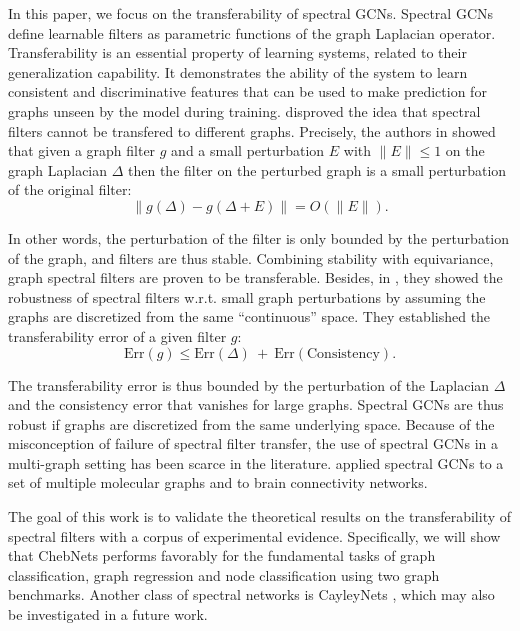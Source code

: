 \documentclass[letterpaper]{article} \usepackage{aaai21}  \usepackage{times}  \usepackage{helvet} \usepackage{courier}  \usepackage[hyphens]{url}  \usepackage{graphicx} \usepackage{natbib}  \usepackage{caption} \frenchspacing  \setlength{\pdfpagewidth}{8.5in}  \setlength{\pdfpageheight}{11in}
\begin{document}
In this paper, we focus on the transferability of spectral GCNs. Spectral GCNs define learnable filters as parametric functions of the graph Laplacian operator.
Transferability is an essential property of learning systems, related to their generalization capability. It demonstrates the ability of the system to learn consistent and discriminative features that can be used to make prediction for graphs unseen by the model during training.
\cite{levie_transferability_2019,levie_transferability_2019-1} disproved the idea that spectral filters cannot be transfered to different graphs. Precisely, the authors in \cite{levie_transferability_2019} showed that given a graph filter $g$ and a small perturbation $E$ with $\|E \|\leq 1$ on the graph Laplacian $\Delta$ then the filter on the perturbed graph is a small perturbation of the original filter:
$$
\| g(\Delta) - g(\Delta+E) \| = O(\|E \|).
$$

In other words, the perturbation of the filter is only bounded by the perturbation of the graph, and filters are thus stable. Combining stability with equivariance, graph spectral filters are proven to be transferable.
Besides, in \cite{levie_transferability_2019-1}, they showed the robustness of spectral filters w.r.t. small graph perturbations by assuming the graphs are discretized from the same “continuous” space. They established the transferability error of a given filter $g$:
$$
\textrm{Err}(g) \leq \textrm{Err}(\Delta) \ + \ \textrm{Err}(\textrm{Consistency}).
$$

The transferability error is thus bounded by the perturbation of the Laplacian $\Delta$ and the consistency error that vanishes for large graphs. Spectral GCNs are thus robust if graphs are discretized from the same underlying space.
Because of the misconception of failure of spectral filter transfer, the use of spectral GCNs in a multi-graph setting has been scarce in the literature. \cite{knyazev_spectral_2018} applied spectral GCNs to a set of multiple molecular graphs and \cite{ktena2018metric} to brain connectivity networks.

The goal of this work is to validate the theoretical results on the transferability of spectral filters with a corpus of experimental evidence. Specifically, we will show that ChebNets \cite{defferrard_convolutional_nodate} performs favorably for the fundamental tasks of graph classification, graph regression and node classification using two graph benchmarks. Another  class of spectral networks is CayleyNets \cite{levie2018cayleynets}, which may also be investigated in a future work.
\end{document}
